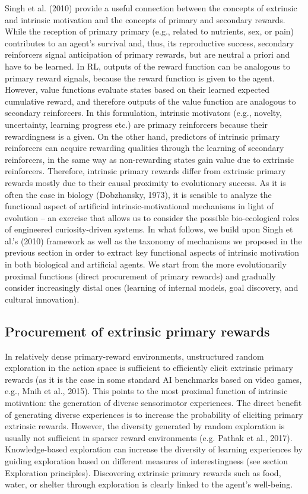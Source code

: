 Singh et al. (2010) provide a useful connection between the concepts of extrinsic and intrinsic motivation and the concepts of primary and secondary rewards. While the reception of primary primary (e.g., related to nutrients, sex, or pain) contributes to an agent’s survival and, thus, its reproductive success, secondary reinforcers signal anticipation of primary rewards, but are neutral a priori and have to be learned. In \ac{RL}, outputs of the reward function can be analogous to primary reward signals, because the reward function is given to the agent. However, value functions evaluate states based on their learned expected cumulative reward, and therefore outputs of the value function are analogous to secondary reinforcers. In this formulation, intrinsic motivators (e.g., novelty, uncertainty, learning progress etc.) are primary reinforcers because their rewardingness is a given. On the other hand, predictors of intrinsic primary reinforcers can acquire rewarding qualities through the learning of secondary reinforcers, in the same way as non-rewarding states gain value due to extrinsic reinforcers. Therefore, intrinsic primary rewards differ from extrinsic primary rewards mostly due to their causal proximity to evolutionary success. As it is often the case in biology (Dobzhansky, 1973), it is sensible to analyze the functional aspect of artificial intrinsic-motivational mechanisms in light of evolution -- an exercise that allows us to consider the possible bio-ecological roles of engineered curiosity-driven systems.
In what follows, we build upon Singh et al.’s (2010) framework as well as the taxonomy of mechanisms we proposed in the previous section in order to extract key functional aspects of intrinsic motivation in both biological and artificial agents. We start from the more evolutionarily proximal functions (direct procurement of primary rewards) and gradually consider increasingly distal ones (learning of internal models, goal discovery, and cultural innovation).

\subsection{Procurement of extrinsic primary rewards}
In relatively dense primary-reward environments, unstructured random exploration in the action space is sufficient to efficiently elicit extrinsic primary rewards (as it is the case in some standard \ac{AI} benchmarks based on video games, e.g., Mnih et al., 2015). This points to the most proximal function of intrinsic motivation: the generation of diverse sensorimotor experiences. The direct benefit of generating diverse experiences is to increase the probability of eliciting primary extrinsic rewards. However, the diversity generated by random exploration is usually not sufficient in sparser reward environments (e.g. Pathak et al., 2017). Knowledge-based exploration can increase the diversity of learning experiences by guiding exploration based on different measures of interestingness (see section Exploration principles). Discovering extrinsic primary rewards such as food, water, or shelter through exploration is clearly linked to the agent’s well-being.

